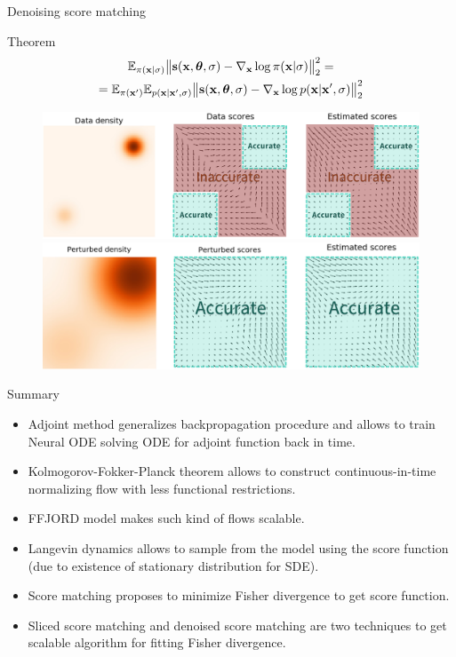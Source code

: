 \begin{frame}{Denoising score matching}
	\begin{block}{Theorem}
		\vspace{-0.8cm}
		\begin{multline*}
			\mathbb{E}_{\pi(\mathbf{x} | \sigma)}\bigl\| \mathbf{s}(\mathbf{x}, \boldsymbol{\theta}, \sigma) - \nabla_{\mathbf{x}} \log \pi(\mathbf{x} | \sigma) \bigr\|^2_2 = \\ = \mathbb{E}_{\pi(\mathbf{x}')} \mathbb{E}_{p(\mathbf{x} | \mathbf{x}', \sigma)}\bigl\| \mathbf{s}(\mathbf{x}, \boldsymbol{\theta}, \sigma) - \nabla_{\mathbf{x}} \log p(\mathbf{x} | \mathbf{x}', \sigma) \bigr\|^2_2	
		\end{multline*}
		\vspace{-0.8cm}
	\end{block}
	\begin{figure}
		\includegraphics[width=0.75\linewidth]{figs/pitfalls}
		\includegraphics[width=0.75\linewidth]{figs/single_noise}
	\end{figure}
\end{frame}
\begin{frame}{Summary}
	\begin{itemize}
		\item Adjoint method generalizes backpropagation procedure and allows to train Neural ODE solving ODE for adjoint function back in time.
		\vfill
		\item Kolmogorov-Fokker-Planck theorem allows to construct continuous-in-time normalizing flow with less functional restrictions.
		\vfill
		\item FFJORD model makes such kind of flows scalable.
		\vfill
		\item Langevin dynamics allows to sample from the model using the score function (due to existence of stationary distribution for SDE).
		\vfill
		\item Score matching proposes to minimize Fisher divergence to get score function.
		\vfill
		\item Sliced score matching and denoised score matching are two techniques to get scalable algorithm for fitting Fisher divergence.
	\end{itemize}
\end{frame}
 